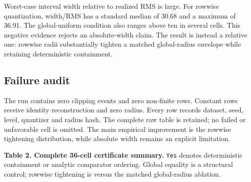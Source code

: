 \documentclass{article}
\begin{document}
Worst-case interval width relative to realized RMS is large. For rowwise quantization, width/RMS has a standard median of 30.68 and a maximum of 36.91. The global-uniform condition also ranges above ten in several cells. This negative evidence rejects an absolute-width claim. The result is instead a relative one: rowwise radii substantially tighten a matched global-radius envelope while retaining deterministic containment.

\subsection{Failure audit}


The run contains zero clipping events and zero non-finite rows. Constant rows receive identity reconstruction and zero radius. Every row records dataset, seed, level, quantizer and radius hash. The complete raw table is retained; no failed or unfavorable cell is omitted. The main empirical improvement is the rowwise tightening distribution, while absolute width remains an explicit limitation.

\textbf{Table 2. Complete 36-cell certificate summary.} \texttt{Yes} denotes deterministic containment or analytic comparator ordering. Global equality is a structural control; rowwise tightening is versus the matched global-radius ablation.
\end{document}
